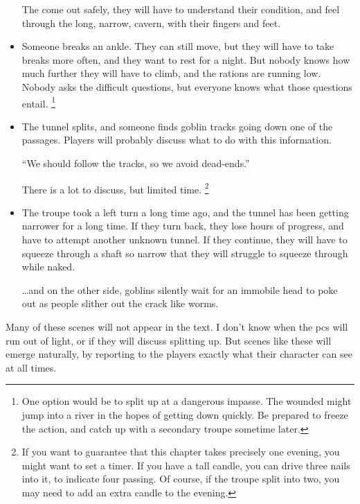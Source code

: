 \begin{multicols}{2}
\begin{itemize}
	The come out safely, they will have to understand their condition, and feel through the long, narrow, cavern, with their fingers and feet.
	\item
	Someone breaks an ankle.
	They can still move, but they will have to take breaks more often, and they want to rest for a night.
	But nobody knows how much further they will have to climb, and the rations are running low.
	Nobody asks the difficult questions, but everyone knows what those questions entail.%
	\footnote{One option would be to split up at a dangerous impasse.
	The wounded might jump into a river in the hopes of getting down quickly.
	Be prepared to freeze the action, and catch up with a secondary troupe sometime later.}
	\item
	The tunnel splits, and someone finds goblin tracks going down one of the passages.
	Players will probably discuss what to do with this information.
	\begin{speechtext}
		``We should follow the tracks, so we avoid dead-ends.''
	\end{speechtext}
	There is a lot to discuss, but limited time.%
	\footnote{If you want to guarantee that this chapter takes precisely one evening, you might want to set a timer.
	If you have a tall candle, you can drive three nails into it, to indicate four  passing.
	Of course, if the troupe split into two, you may need to add an extra candle to the evening.}
	\item
	The troupe took a left turn a long time ago, and the tunnel has been getting narrower for a long time.
	If they turn back, they lose hours of progress, and have to attempt another unknown tunnel.
	If they continue, they will have to squeeze through a shaft so narrow that they will struggle to squeeze through while naked.

	\ldots and on the other side, goblins silently wait for an immobile head to poke out as people slither out the crack like worms.
\end{itemize}

Many of these scenes will not appear in the text.
I don't know when the \glspl{pc} will run out of light, or if they will discuss splitting up.
But scenes like these will emerge naturally, by reporting to the players exactly what their character can see at all times.

\end{multicols}

